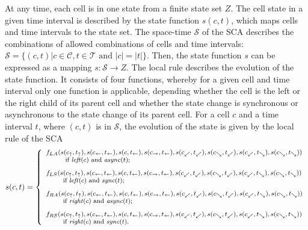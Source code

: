 \documentclass[pre,amssymb,showpacs,showkeys,preprint]{revtex4}
\begin{document}
At any time, each cell is in one state from a finite state set $Z$.
The cell state in a given time interval is described by the state function $s(c,t)$,
which maps cells and time intervals to the state set.
The space-time $\mathcal{S}$ of the SCA describes the combinations of allowed combinations of cells and time intervals:
$\mathcal{S} = \{(c,t)| c \in \mathcal{C}, t \in \mathcal{T} \mbox{ and } |c| =|t|\}$.
Then, the state function $s$ can be expressed as a mapping $s: \mathcal{S} \rightarrow Z$.
The local rule describes the evolution of the state function.
It consists of four functions, whereby for a given cell and time interval only one
function is applicable, depending whether the cell is the left or the right child of its parent cell and
whether the state change is synchronous or asynchronous to the state change of its parent cell.
For a cell $c$ and a time interval $t$, where $(c, t)$ is in $\mathcal{S}$, the
evolution of the state is given by the local rule of the SCA
\begin{equation}
\label{eq:local-rule}
\footnotesize
s(c,t) = \left\{
\begin{array}{l}
f_{LA}(
        s(c_\uparrow, t_\uparrow),
        s(c_\leftarrow, t_\leftarrow), s(c, t_\leftarrow), s(c_\rightarrow, t_\leftarrow),
        s(c_\swarrow, t_\swarrow), s(c_\searrow, t_\swarrow),
        s(c_\swarrow, t_\searrow), s(c_\searrow, t_\searrow)
)
\\
\hspace{0.3in} \mbox{ if  $\mathit{left}(c)$ and $\mathit{async}(t)$;} \vspace{0.1in}
\\
f_{LS}(
        s(c_\uparrow, t_\uparrow),
        s(c_\leftarrow, t_\leftarrow), s(c, t_\leftarrow), s(c_\rightarrow, t_\leftarrow),
        s(c_\swarrow, t_\swarrow), s(c_\searrow, t_\swarrow),
        s(c_\swarrow, t_\searrow), s(c_\searrow, t_\searrow)
)
\\
\hspace{0.3in} \mbox{if $\mathit{left}(c)$ and $\mathit{sync}(t);$}  \vspace{0.1in}
\\
f_{RA}(
        s(c_\uparrow, t_\uparrow),
        s(c_\leftarrow, t_\leftarrow), s(c, t_\leftarrow), s(c_\rightarrow, t_\leftarrow),
        s(c_\swarrow, t_\swarrow), s(c_\searrow, t_\swarrow),
        s(c_\swarrow, t_\searrow), s(c_\searrow, t_\searrow)
)
\\
\hspace{0.3in} \mbox{if $\mathit{right}(c)$ and $\mathit{async}(t)$;} \vspace{0.1in}
\\
f_{RS}(
        s(c_\uparrow, t_\uparrow),
        s(c_\leftarrow, t_\leftarrow), s(c, t_\leftarrow), s(c_\rightarrow, t_\leftarrow),
        s(c_\swarrow, t_\swarrow), s(c_\searrow, t_\swarrow),
        s(c_\swarrow, t_\searrow), s(c_\searrow, t_\searrow)
)
\\
\hspace{0.3in} \mbox{if $\mathit{right}(c)$ and $\mathit{sync}(t).$} \\

\end{array}
\right.
\end{equation}
\end{document}
